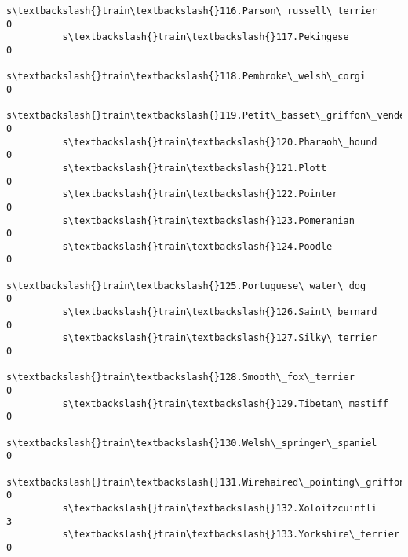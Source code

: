 \documentclass[11pt]{article}
\begin{document}
\begin{Verbatim}[commandchars=\\\{\}]
          s\textbackslash{}train\textbackslash{}116.Parson\_russell\_terrier                                       0   
          s\textbackslash{}train\textbackslash{}117.Pekingese                                                    0   
          s\textbackslash{}train\textbackslash{}118.Pembroke\_welsh\_corgi                                         0   
          s\textbackslash{}train\textbackslash{}119.Petit\_basset\_griffon\_vendeen                                 0   
          s\textbackslash{}train\textbackslash{}120.Pharaoh\_hound                                                0   
          s\textbackslash{}train\textbackslash{}121.Plott                                                        0   
          s\textbackslash{}train\textbackslash{}122.Pointer                                                      0   
          s\textbackslash{}train\textbackslash{}123.Pomeranian                                                   0   
          s\textbackslash{}train\textbackslash{}124.Poodle                                                       0   
          s\textbackslash{}train\textbackslash{}125.Portuguese\_water\_dog                                         0   
          s\textbackslash{}train\textbackslash{}126.Saint\_bernard                                                0   
          s\textbackslash{}train\textbackslash{}127.Silky\_terrier                                                0   
          s\textbackslash{}train\textbackslash{}128.Smooth\_fox\_terrier                                           0   
          s\textbackslash{}train\textbackslash{}129.Tibetan\_mastiff                                              0   
          s\textbackslash{}train\textbackslash{}130.Welsh\_springer\_spaniel                                       0   
          s\textbackslash{}train\textbackslash{}131.Wirehaired\_pointing\_griffon                                  0   
          s\textbackslash{}train\textbackslash{}132.Xoloitzcuintli                                               3   
          s\textbackslash{}train\textbackslash{}133.Yorkshire\_terrier                                            0   
          

\end{Verbatim}
\end{document}
